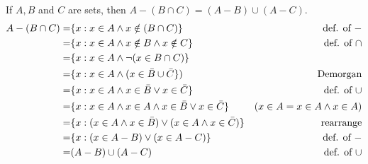 \documentclass[openany, 12pt]{book}
\begin{document}
\begin{exercise}{}{}
	If $A, B$ and $C$ are sets, then $A-(B \cap C)=(A-B) \cup(A-C)$.
	\begin{align*}
		A-(B \cap C)= & \{x: x\in A \land x\notin(B \cap C)\}                              & \text{def. of }-                \\
		=             & \{x: x\in A \land x\notin B \land x\notin C\}                      & \text{def. of $\cap$}           \\
		=             & \{x: x\in A \land \neg{(x\in B \cap C})\}                          &                                 \\
		=             & \{x: x\in A \land (x\in \bar{B} \cup \bar{C}\})                    & \text{Demorgan}                 \\
		=             & \{x: x\in A \land x\in \bar{B} \lor x\in\bar{C}\}                  & \text{def. of }\cup             \\
		=             & \{x: x\in A \land x\in A \land x\in \bar{B} \lor x\in\bar{C}\}     & (x\in A = x\in A \land x \in A) \\
		=             & \{x: (x\in A \land x\in \bar{B}) \lor (x\in A \land x\in\bar{C})\} & \text{rearrange}                \\
		=             & \{x: (x\in A  - B) \lor (x\in A - C)\}                             & \text{def. of }-                \\
		=             & (A - B) \cup (A-C)                                                   & \text{def. of }\cup             \\
	\end{align*}
\end{exercise}
\end{document}
